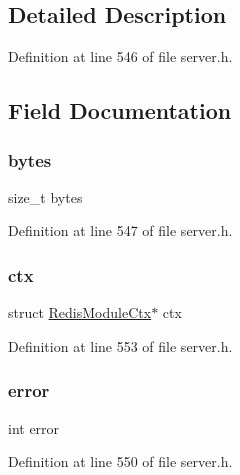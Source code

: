 \subsection{Detailed Description}


Definition at line 546 of file server.\+h.



\subsection{Field Documentation}
\mbox{\label{struct_redis_module_i_o_ad85da8142cdb13f7b5eaf889a527f3dd}} 
\subsubsection{\texorpdfstring{bytes}{bytes}}
{\footnotesize\ttfamily size\+\_\+t bytes}



Definition at line 547 of file server.\+h.

\mbox{\label{struct_redis_module_i_o_a42b495e9ea53fa67943ff943d4ed10ff}} 
\subsubsection{\texorpdfstring{ctx}{ctx}}
{\footnotesize\ttfamily struct \hyperlink{struct_redis_module_ctx}{Redis\+Module\+Ctx}$\ast$ ctx}



Definition at line 553 of file server.\+h.

\mbox{\label{struct_redis_module_i_o_a11614f44ef4d939bdd984953346a7572}} 
\subsubsection{\texorpdfstring{error}{error}}
{\footnotesize\ttfamily int error}



Definition at line 550 of file server.\+h.

